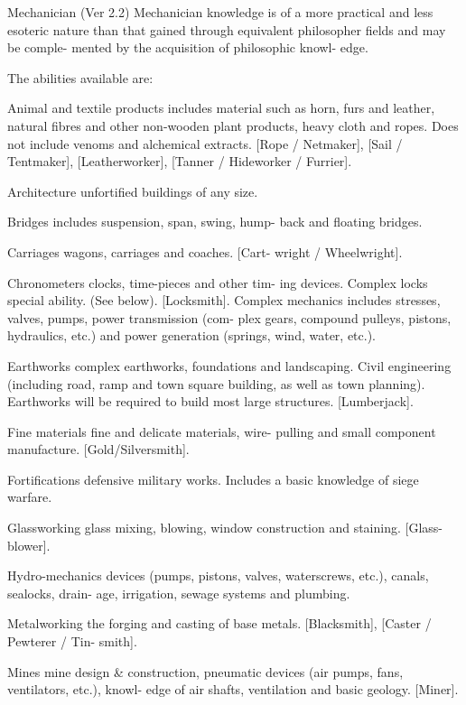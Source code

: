 \begin{Chapter}{Mechanician (Ver 2.2)}
Mechanician knowledge is of a more practical and 
less  esoteric  nature  than  that  gained  through 
equivalent  philosopher  fields  and  may  be  comple-
mented  by  the  acquisition  of  philosophic  knowl-
edge. 

The abilities available are: 

Animal  and  textile  products  includes  material 
such  as  horn,  furs  and  leather,  natural  fibres  and 
other  non-wooden  plant  products, heavy  cloth  and 
ropes.  Does  not  include  venoms  and  alchemical 
extracts.  [Rope  /  Netmaker],  [Sail  /  Tentmaker], 
[Leatherworker], [Tanner / Hideworker / Furrier]. 

Architecture unfortified buildings of any size. 

Bridges  includes  suspension,  span,  swing,  hump-
back and floating bridges. 

Carriages  wagons,  carriages  and  coaches.  [Cart-
wright / Wheelwright]. 

Chronometers  clocks,  time-pieces  and  other  tim-
ing  devices.  Complex  locks  special  ability.  (See 
below). [Locksmith]. Complex mechanics includes 
stresses,  valves,  pumps, power  transmission  (com-
plex  gears,  compound pulleys,  pistons,  hydraulics, 
etc.)  and  power  generation  (springs,  wind,  water, 
etc.). 

Earthworks complex earthworks, foundations and 
landscaping.  Civil  engineering  (including  road, 
ramp  and  town  square  building,  as  well  as  town 
planning).  Earthworks  will  be  required  to  build 
most large structures. [Lumberjack]. 

Fine  materials  fine  and  delicate  materials,  wire-
pulling  and 
small  component  manufacture. 
[Gold/Silversmith]. 

Fortifications defensive military works. Includes a 
basic knowledge of siege warfare. 

Glassworking  glass  mixing,  blowing,  window 
construction and staining. [Glass-blower]. 

Hydro-mechanics  devices 
(pumps,  pistons, 
valves,  waterscrews,  etc.),  canals,  sealocks,  drain-
age, irrigation, sewage systems and plumbing. 

Metalworking  the  forging  and  casting  of  base 
metals.  [Blacksmith],  [Caster  /  Pewterer  /  Tin-
smith]. 

Mines  mine  design  \&  construction,  pneumatic 
devices  (air  pumps,  fans,  ventilators,  etc.),  knowl-
edge  of  air  shafts,  ventilation  and  basic  geology. 
[Miner]. 


\end{Chapter}
